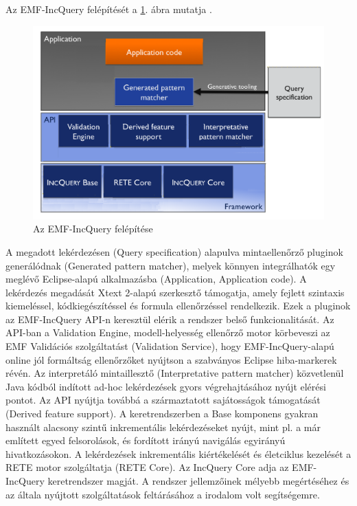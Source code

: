 Az EMF-IncQuery felépítését a \ref{fig:EMFIncQueryStructure}. ábra mutatja \cite{Bergmann-TOOLS-2012}.
%
\begin{figure}[htb]
\centering
\includegraphics[width=\textwidth]{figures/emf-incquery-structure.png}
\caption{Az EMF-IncQuery felépítése}
\label{fig:EMFIncQueryStructure}
\end{figure}
%
A megadott lekérdezésen (Query specification) alapulva mintaellenőrző pluginok generálódnak (Generated pattern matcher), melyek könnyen integrálhatók egy meglévő Eclipse-alapú alkalmazásba (Application, Application code).
A lekérdezés megadását Xtext 2-alapú szerkesztő támogatja, amely fejlett szintaxis kiemeléssel, kódkiegészítéssel és formula ellenőrzéssel rendelkezik.
Ezek a pluginok az EMF-IncQuery API-n keresztül elérik a rendszer belső funkcionalitását.
Az API-ban a Validation Engine, modell-helyesség ellenőrző motor körbeveszi az \gls{EMF} Validációs szolgáltatást (Validation Service), hogy EMF-IncQuery-alapú online jól formáltság ellenőrzőket nyújtson a szabványos Eclipse hiba-markerek révén.
Az interpretáló mintaillesztő (Interpretative pattern matcher) közvetlenül Java kódból indított ad-hoc lekérdezések gyors végrehajtásához nyújt elérési pontot.
Az API nyújtja továbbá a származtatott sajátosságok támogatását (Derived feature support).
A keretrendszerben a Base komponens gyakran használt alacsony szintű inkrementális lekérdezéseket nyújt, mint pl. a már említett egyed felsorolások, és fordított irányú navigálás egyirányú hivatkozásokon.
A lekérdezések inkrementális kiértékelését és életciklus kezelését a RETE motor szolgáltatja (RETE Core).
Az IncQuery Core adja az EMF-IncQuery keretrendszer magját.
A rendszer jellemzőinek mélyebb megértéséhez és az általa nyújtott szolgáltatások feltárásához a \cite{Bergmann-TOOLS-2012} irodalom volt segítségemre.

